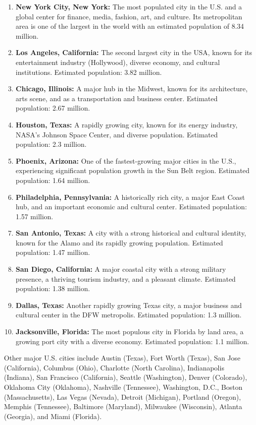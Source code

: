 \begin{enumerate}
    \item \textbf{New York City, New York:} The most populated city in the U.S. and a global center for finance, media, fashion, art, and culture. Its metropolitan area is one of the largest in the world with an estimated population of 8.34 million.
    \item \textbf{Los Angeles, California:} The second largest city in the USA, known for its entertainment industry (Hollywood), diverse economy, and cultural institutions. Estimated population: 3.82 million.
    \item \textbf{Chicago, Illinois:} A major hub in the Midwest, known for its architecture, arts scene, and as a transportation and business center. Estimated population: 2.67 million.
    \item \textbf{Houston, Texas:} A rapidly growing city, known for its energy industry, NASA's Johnson Space Center, and diverse population. Estimated population: 2.3 million.
    \item \textbf{Phoenix, Arizona:} One of the fastest-growing major cities in the U.S., experiencing significant population growth in the Sun Belt region. Estimated population: 1.64 million.
    \item \textbf{Philadelphia, Pennsylvania:} A historically rich city, a major East Coast hub, and an important economic and cultural center. Estimated population: 1.57 million.
    \item \textbf{San Antonio, Texas:} A city with a strong historical and cultural identity, known for the Alamo and its rapidly growing population. Estimated population: 1.47 million.
    \item \textbf{San Diego, California:} A major coastal city with a strong military presence, a thriving tourism industry, and a pleasant climate. Estimated population: 1.38 million.
    \item \textbf{Dallas, Texas:} Another rapidly growing Texas city, a major business and cultural center in the DFW metropolis. Estimated population: 1.3 million.
    \item \textbf{Jacksonville, Florida:} The most populous city in Florida by land area, a growing port city with a diverse economy. Estimated population: 1.1 million.
\end{enumerate}

Other major U.S. cities include Austin (Texas), Fort Worth (Texas), San Jose (California), Columbus (Ohio), Charlotte (North Carolina), Indianapolis (Indiana), San Francisco (California), Seattle (Washington), Denver (Colorado), Oklahoma City (Oklahoma), Nashville (Tennessee), Washington, D.C., Boston (Massachusetts), Las Vegas (Nevada), Detroit (Michigan), Portland (Oregon), Memphis (Tennessee), Baltimore (Maryland), Milwaukee (Wisconsin), Atlanta (Georgia), and Miami (Florida).

